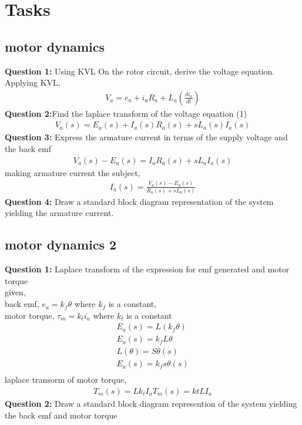 \documentclass[10pt,a4paper]{report}
\begin{document}
\section{Tasks}
\subsection{motor dynamics}

\textbf{Question 1:}
Using KVL On the rotor circuit, derive the voltage equation.\newline
Applying KVL,
\begin{eqnarray}
  V_{a}=e_{a} + i_{a}R_{a} + L_{a} \left( \frac{di_{a}}{dt} \right)
\end{eqnarray}
\textbf{Question 2:}Find the laplace transform  of the voltage equation (1)
\begin{eqnarray}
  V_{a}(s) = E_{a}(s) + I_{a}(s)R_{a}(s) + sL_{a}(s)I_{a}(s)
\end{eqnarray}
\textbf{Question 3:}
Express the armature current in terms of the supply voltage and the back emf
\begin{eqnarray}
  V_{a}(s) - E_{a}(s) = I_{a}R_{a}(s) + sL_{a}I_{a}(s)
\end{eqnarray}
making armature current the subject,
\begin{eqnarray}
  I_{a}(s) = \frac{{V_{a}(s) - E_{a}(s)}}{{R_{a}(s) + sL_{a}(s)}}
\end{eqnarray}
\textbf{Question 4:}
Draw a standard block diagram representation of the system yielding the armature current.\\
\subsection{motor dynamics 2}

\textbf{Question 1:}
Laplace transform of the expression for emf generated and motor torque\\
given,\\
back emf, $e_{a} = k_{f} \theta$ where $k_{f}$ is a constant,\\
motor torque, $\tau_{m} = k_{t}i_{a}$ where $k_{t}$ is a constant
\begin{eqnarray}
  E_{a}(s) = L(k_{f} \theta)\\
  E_{a}(s) = k_{f}L\theta\\
  L(\theta) = S\theta(s)\\
  E_{a}(s) = k_{f}s\theta(s)\\
\end{eqnarray}
laplace transorm of motor torque,\\
\begin{eqnarray}
  T_{m}(s) = Lk_{t}I_{a}
  T_{m}(s) = k{t}LI_{a}
\end{eqnarray}
\textbf{Question 2:}
Draw a standard block diagram represention of the system yielding the back emf and motor torque\\
\end{document}
